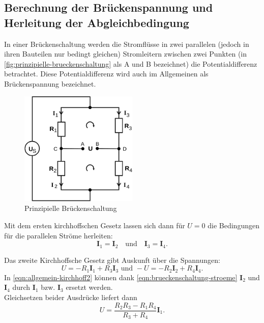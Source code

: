\subsection{Berechnung der Brückenspannung und Herleitung der 
Abgleichbedingung}
\label{sec:abgleichbedingung}

In einer Brückenschaltung werden die Stromflüsse in zwei parallelen (jedoch in ihren
Bauteilen nur bedingt gleichen) Stromleitern zwischen zwei Punkten (in 
\autoref{fig:prinzipielle-brueckenschaltung} als A und B bezeichnet) die Potentialdifferenz 
betrachtet.
Diese Potentialdifferenz wird auch im Allgemeinen als Brückenspannung bezeichnet.

\begin{figure}[H]
	\centering
	\includegraphics[width=0.5\textwidth]{bilder/prinzipielle-brueckenschaltung.png}
	\caption{Prinzipielle Brückenschaltung}
	\label{fig:prinzipielle-brueckenschaltung}
\end{figure}

Mit dem ersten kirchhoffschen Gesetz lassen sich dann für $U=0$ die Bedingungen für
die parallelen Ströme herleiten:
\begin{equation}
	\mathbf{I}_1 = \mathbf{I}_2
	\quad \text{und} \quad
	\mathbf{I}_3 = \mathbf{I}_4.
	\label{eqn:brueckenschaltung-stroeme}
\end{equation}

Das zweite Kirchhoffsche Gesetz gibt Auskunft über die Spannungen:
\begin{equation}
	U = - R_1 \mathbf{I}_1 + R_3 \mathbf{I}_3
	\text{ und }
	-U = -R_2 \mathbf{I}_2 + R_4 \mathbf{I}_4.
	\label{eqn:allgemein-kirchhoff2}
\end{equation}
In \autoref{eqn:allgemein-kirchhoff2} können dank \autoref{eqn:brueckenschaltung-stroeme} 
$\mathbf{I}_2$ und $\mathbf{I}_4$ durch $\mathbf{I}_1$ bzw. $\mathbf{I}_3$ ersetzt werden.
\\
Gleichsetzen beider Ausdrücke liefert dann
\begin{equation}
	U = \frac{R_2 R_3 - R_1 R_4}{R_3 + R_4} \mathbf{I}_1.
	\label{eqn:ablgeich-abhaengig}
\end{equation}

